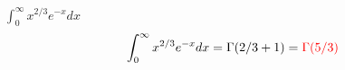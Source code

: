 \item [8.] $\int_0^\infty x^{2/3}e^{-x}dx$
\[
    \int_0^\infty x^{2/3}e^{-x}dx = \Gamma(2/3+1)=\textcolor{red}{\Gamma(5/3)}
\]